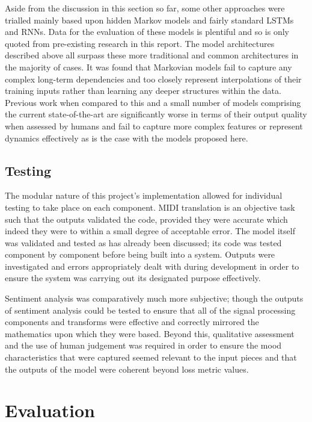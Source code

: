 \documentclass[12pt,]{article}
\begin{document}
Aside from the discussion in this section so far, some other approaches
were trialled mainly based upon hidden Markov models and fairly standard
LSTMs and RNNs. Data for the evaluation of these models is plentiful and
so is only quoted from pre-existing research in this report. The model
architectures described above all surpass these more traditional and
common architectures in the majority of cases. It was found that
Markovian models fail to capture any complex long-term dependencies and
too closely represent interpolations of their training inputs rather
than learning any deeper structures within the data. Previous work when
compared to this and a small number of models comprising the current
state-of-the-art are significantly worse in terms of their output
quality when assessed by humans and fail to capture more complex
features or represent dynamics effectively as is the case with the
models proposed here.

\hypertarget{testing}{%
\subsection{Testing}\label{testing}}

The modular nature of this project's implementation allowed for
individual testing to take place on each component. MIDI translation is
an objective task such that the outputs validated the code, provided
they were accurate which indeed they were to within a small degree of
acceptable error. The model itself was validated and tested as has
already been discussed; its code was tested component by component
before being built into a system. Outputs were investigated and errors
appropriately dealt with during development in order to ensure the
system was carrying out its designated purpose effectively.

Sentiment analysis was comparatively much more subjective; though the
outputs of sentiment analysis could be tested to ensure that all of the
signal processing components and transforms were effective and correctly
mirrored the mathematics upon which they were based. Beyond this,
qualitative assessment and the use of human judgement was required in
order to ensure the mood characteristics that were captured seemed
relevant to the input pieces and that the outputs of the model were
coherent beyond loss metric values.

\hypertarget{evaluation}{%
\section{Evaluation}\label{evaluation}}
\end{document}
